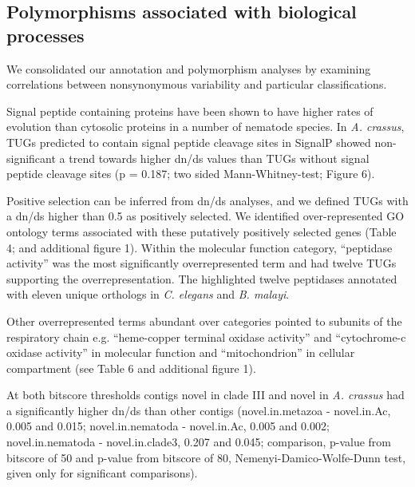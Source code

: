 \documentclass[10pt]{bmc_article}
\newenvironment{bmcformat}{\begin{raggedright}\baselineskip20pt\sloppy\setboolean{publ}{false}}{\end{raggedright}\baselineskip20pt\sloppy}
\begin{document}
\begin{bmcformat}
\subsection*{Polymorphisms associated with biological processes}

We consolidated our annotation and polymorphism analyses by examining
correlations between nonsynonymous variability and particular
classifications.

Signal peptide containing proteins have been shown to have higher
rates of evolution than cytosolic proteins in a number of nematode
species. In \textit{A. crassus}, TUGs predicted to contain signal
peptide cleavage sites in SignalP showed non-significant a trend
towards higher dn/ds values than TUGs without signal peptide cleavage
sites (p = 0.187; two sided
Mann-Whitney-test; Figure 6).

Positive selection can be inferred from dn/ds analyses, and we defined
TUGs with a dn/ds higher than 0.5 as positively selected. We
identified over-represented GO ontology terms associated with these
putatively positively selected genes (Table 4; and additional figure
1). Within the molecular function category, ``peptidase activity'' was
the most significantly overrepresented term and had twelve TUGs
supporting the overrepresentation. The highlighted twelve peptidases
annotated with eleven unique orthologs in \textit{C. elegans} and
\textit{B. malayi}.



Other overrepresented terms abundant over categories pointed to
subunits of the respiratory chain e.g. ``heme-copper terminal oxidase
activity'' and ``cytochrome-c oxidase activity'' in molecular function
and ``mitochondrion'' in cellular compartment (see Table 6 and
additional figure 1).

At both bitscore thresholds contigs novel in clade III and novel in
\textit{A. crassus} had a significantly higher dn/ds than other
contigs (novel.in.metazoa - novel.in.Ac, 0.005 and 0.015;
novel.in.nematoda - novel.in.Ac, 0.005 and 0.002; novel.in.nematoda -
novel.in.clade3, 0.207 and 0.045; comparison, p-value from bitscore of
50 and p-value from bitscore of 80, Nemenyi-Damico-Wolfe-Dunn test,
given only for significant comparisons).


\end{bmcformat}
\end{document}
